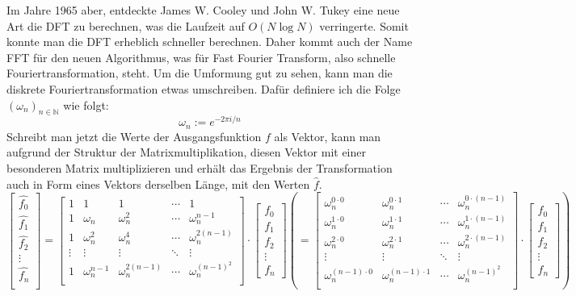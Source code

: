 \documentclass[a4paper,12pt]{article}
\theoremstyle{definition}
\theoremstyle{remark}
\begin{document}
Im Jahre 1965 aber, entdeckte James W. Cooley und John W. Tukey eine neue Art die DFT zu 
berechnen, was die Laufzeit auf $O(N\log N)$ verringerte. Somit konnte man die DFT erheblich 
schneller berechnen. Daher kommt auch der Name FFT für den neuen Algorithmus, was für Fast Fourier 
Transform, also schnelle Fouriertransformation, steht. Um die Umformung gut zu sehen, kann man die 
diskrete Fouriertransformation etwas umschreiben. Dafür definiere ich die Folge $(\omega_n)_{n\in\mathbb{N}}$ 
wie folgt:
$$\omega_n := e^{-2\pi i /n}$$
Schreibt man jetzt die Werte der Ausgangsfunktion $f$ als Vektor, kann man aufgrund der Struktur 
der Matrixmultiplikation, diesen Vektor mit einer besonderen Matrix multiplizieren und erhält das 
Ergebnis der Transformation auch in Form eines Vektors derselben Länge, mit den Werten $\hat{f}$. 
\[
\begin{bmatrix}
  \hat{f_0}\\
\hat{f_1}\\
\hat{f_2}\\
\vdots \\
\hat{f_n}\\
\end{bmatrix}
=
\begin{bmatrix}
  1 & 1 & 1 & \cdots & 1\\
  1 & \omega_n & \omega_n^2 & \cdots & \omega_n^{n-1} \\
  1 & \omega_n^2 & \omega_n^4 & \cdots & \omega_n^{2(n-1)}\\
  \vdots & \vdots & \vdots & \ddots & \vdots \\
  1 & \omega_n^{n-1} & \omega_n^{2(n-1)} & \cdots & \omega_n^{(n-1)^2}\\
\end{bmatrix}
\cdot
\begin{bmatrix}
  f_0\\
  f_1\\
  f_2\\
  \vdots\\
  f_n
\end{bmatrix}
\left(
  = 
\begin{bmatrix}
  \omega_n^{0 \cdot 0} & \omega_n^{0 \cdot 1} & \cdots & \omega_n^{0 \cdot (n-1)}\\
  \omega_n^{1 \cdot 0} & \omega_n^{1 \cdot 1} &  \cdots & \omega_n^{1 \cdot (n-1)} \\
  \omega_n^{2 \cdot 0} & \omega_n^{2 \cdot 1} &  \cdots & \omega_n^{2 \cdot (n-1)}\\
  \vdots & \vdots & \ddots & \vdots \\
  \omega_n^{(n-1) \cdot 0} & \omega_n^{(n-1) \cdot 1} & \cdots & \omega_n^{(n-1)^2}\\
\end{bmatrix}
\cdot
\begin{bmatrix}
  f_0\\
  f_1\\
  f_2\\
  \vdots\\
  f_n
\end{bmatrix}
\right)
\]
\end{document}
